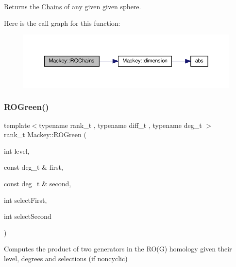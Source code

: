 Returns the \hyperlink{classMackey_1_1Chains}{Chains} of any given given sphere. 

Here is the call graph for this function\+:\nopagebreak
\begin{figure}[H]
\begin{center}
\leavevmode
\includegraphics[width=350pt]{namespaceMackey_abd3c2e12c91baa573c6dbaa37eeb0518_cgraph}
\end{center}
\end{figure}
\mbox{\label{namespaceMackey_a2bd86833844ca62d76c47a54aeb0bb77}} 
\subsubsection{\texorpdfstring{R\+O\+Green()}{ROGreen()}\hspace{0.1cm}{\footnotesize\ttfamily [1/2]}}
{\footnotesize\ttfamily template$<$typename rank\+\_\+t , typename diff\+\_\+t , typename deg\+\_\+t $>$ \\
rank\+\_\+t Mackey\+::\+R\+O\+Green (\begin{DoxyParamCaption}\item[{int}]{level,  }\item[{const deg\+\_\+t \&}]{first,  }\item[{const deg\+\_\+t \&}]{second,  }\item[{int}]{select\+First,  }\item[{int}]{select\+Second }\end{DoxyParamCaption})}



Computes the product of two generators in the R\+O(\+G) homology given their level, degrees and selections (if noncyclic) 

